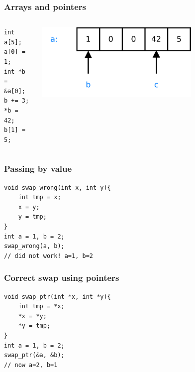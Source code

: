 \begin{frame}[fragile]
\frametitle{Arrays and pointers}
\begin{columns}[c]
  \begin{column}{0.5\textwidth}
\lstset{language=C++,numbers=left}
\begin{lstlisting}
int a[5];
a[0] = 1;
int *b = &a[0];
b += 3;
*b = 42;
b[1] = 5;
\end{lstlisting}
  \end{column}
  \begin{column}{0.5\textwidth}
    \includegraphics[width=0.7\textwidth]{figures/array.pdf}
  \end{column}
\end{columns}
\end{frame}

\begin{frame}[fragile]
\frametitle{Passing by value}
\begin{lstlisting}
void swap_wrong(int x, int y){
    int tmp = x;
    x = y;
    y = tmp;
}
int a = 1, b = 2;
swap_wrong(a, b);
// did not work! a=1, b=2
\end{lstlisting}
\end{frame}

\begin{frame}[fragile]
\frametitle{Correct swap using pointers}
\begin{lstlisting}
void swap_ptr(int *x, int *y){
    int tmp = *x;
    *x = *y;
    *y = tmp;
}
int a = 1, b = 2;
swap_ptr(&a, &b);
// now a=2, b=1
\end{lstlisting}
\end{frame}

